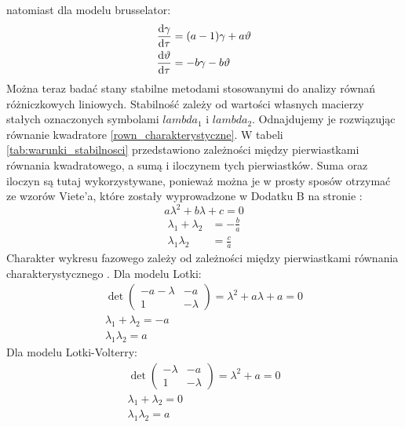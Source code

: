 \documentclass[10pt, a4paper, twoside, onecolumn]{article}
\numberwithin{equation}{section}
\begin{document}
	natomiast dla modelu brusselator:
	\begin{equation}\label{bruskelator_lin}
	\begin{split}
		\dv{\gamma}{\tau} &= (a-1)\gamma+a\vartheta \\
		\dv{\vartheta}{\tau} &= -b\gamma-b\vartheta
	\end{split}
	\end{equation}
	Można teraz badać stany stabilne metodami stosowanymi do analizy równań różniczkowych liniowych. Stabilność zależy od wartości własnych macierzy stałych oznaczonych symbolami \(lambda_{1}\) i \(lambda_{2}\). Odnajdujemy je rozwiązując równanie kwadratore \eqref{rown_charakterystyczne}. W tabeli \ref{tab:warunki_stabilnosci} przedstawiono zależności między pierwiastkami równania kwadratowego, a sumą i iloczynem tych pierwiastków. Suma oraz iloczyn są tutaj wykorzystywane, ponieważ można je w prosty sposów otrzymać ze wzorów Viete'a, które zostały wyprowadzone w Dodatku B na stronie \pageref{}: 
	\begin{equation}\label{rown_charakterystyczne}
		a\lambda^{2} + b\lambda + c = 0
	\end{equation}
	\begin{equation}
	\begin{split}
		\lambda_{1} + \lambda_{2} &= -\frac{b}{a} \\
		\lambda_{1}\lambda_{2} &= \frac{c}{a}
	\end{split}
	\end{equation}
	Charakter wykresu fazowego zależy od zależności między pierwiastkami równania charakterystycznego \cite{orlik}.
	Dla modelu Lotki:
	\begin{equation}\label{lotka_charakterystyczne}
	\begin{split}
		\det
		\begin{pmatrix}
			-a-\lambda & -a \\
			1 & -\lambda
		\end{pmatrix}
		=\lambda^{2}+a\lambda+a=0 \\
		\lambda_{1}+\lambda_{2}=-a \\
		\lambda_{1}\lambda_{2}=a
	\end{split}
	\end{equation}
	Dla modelu Lotki-Volterry:
	\begin{equation}\label{lotka_volterra_charakterystyczne}
	\begin{split}
		\det
		\begin{pmatrix}
			-\lambda & -a \\
			1 & -\lambda
		\end{pmatrix}
		=\lambda^{2}+a=0 \\
		\lambda_{1}+\lambda_{2}=0 \\
		\lambda_{1}\lambda_{2}=a
	\end{split}
	\end{equation}
\end{document}
